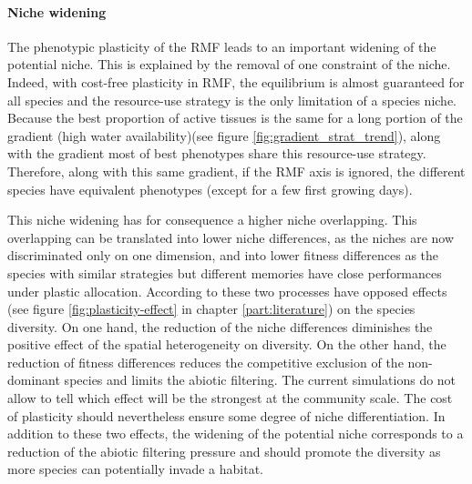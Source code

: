 


\paragraph{Niche widening}

The phenotypic plasticity of the RMF leads to an important widening of the potential niche. This is explained by the removal of one constraint of the niche. Indeed, with cost-free plasticity in RMF, the equilibrium is almost guaranteed for all species and the resource-use strategy is the only limitation of a species niche. Because the best proportion of active tissues is the same for a long portion of the gradient (high water availability)(see figure \ref{fig:gradient_strat_trend}), along with the gradient most of best phenotypes share this resource-use strategy. Therefore, along with this same gradient, if the RMF axis is ignored, the different species have equivalent phenotypes (except for a few first growing days).

This niche widening has for consequence a higher niche overlapping. This overlapping can be translated into lower niche differences, as the niches are now discriminated only on one dimension, and into lower fitness differences as the species with similar strategies but different memories have close performances under plastic allocation. According to \cite{turcotte_phenotypic_2016} these two processes have opposed effects (see figure \ref{fig:plasticity-effect} in chapter \ref{part:literature}) on the species diversity. On one hand, the reduction of the niche differences diminishes the positive effect of the spatial heterogeneity on diversity. On the other hand, the reduction of fitness differences reduces the competitive exclusion of the non-dominant species and limits the abiotic filtering. The current simulations do not allow to tell which effect will be the strongest at the community scale. The cost of plasticity should nevertheless ensure some degree of niche differentiation. In addition to these two effects, the widening of the potential niche corresponds to a reduction of the abiotic filtering pressure and should promote the diversity as more species can potentially invade a habitat. 

